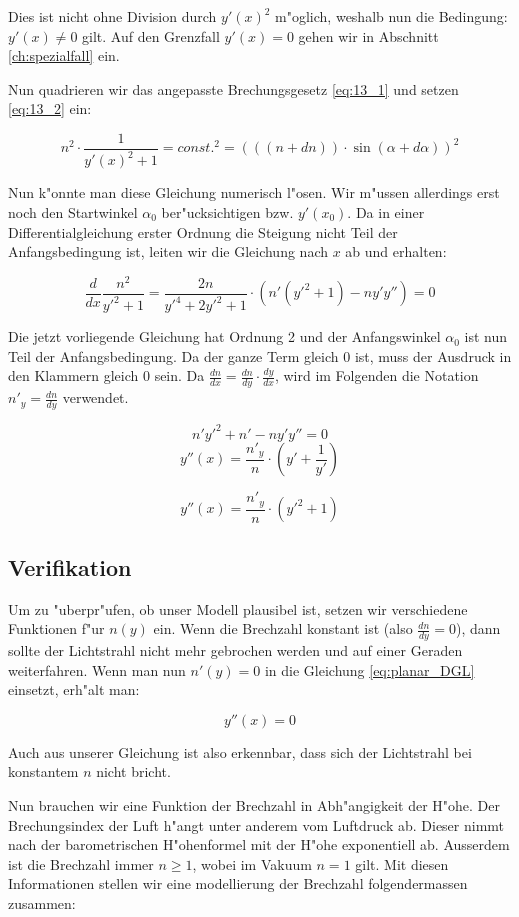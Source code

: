 \begin{refsection}
%
%
Dies ist nicht ohne Division durch $y'(x)^2$ m"oglich, weshalb nun die Bedingung: $y'(x) \neq 0$ gilt.
Auf den Grenzfall $y'(x) = 0$ gehen wir in Abschnitt \ref{ch:spezialfall} ein.

Nun quadrieren wir das angepasste Brechungsgesetz \ref{eq:13_1} und setzen \ref{eq:13_2} ein:

$$n^2 \cdot \frac{1}{y'(x)^2 + 1} = const.^2 = (((n + dn)) \cdot \sin(\alpha + d\alpha))^2$$

Nun k"onnte man diese Gleichung numerisch l"osen. 
Wir m"ussen allerdings erst noch den Startwinkel $\alpha_0$ ber"ucksichtigen bzw. $y'(x_0)$.
Da in einer Differentialgleichung erster Ordnung die Steigung nicht Teil der Anfangsbedingung ist, leiten wir die Gleichung nach $x$ ab und erhalten:

$$\frac{d}{dx} \frac{n^2}{y'^2 + 1}  = \frac{2n}{y'^4 + 2y'^2 + 1} \cdot \left( n'(y'^2 + 1) - n y' y'' \right) = 0$$

Die jetzt vorliegende Gleichung hat Ordnung 2 und der Anfangswinkel $\alpha_0$ ist nun Teil der Anfangsbedingung. 
Da der ganze Term gleich 0 ist, muss der Ausdruck in den Klammern gleich 0 sein.
Da $\frac{dn}{dx} = \frac{dn}{dy} \cdot \frac{dy}{dx}$, wird im Folgenden die Notation $n'_y = \frac{dn}{dy}$ verwendet.

$$n' y'^2 + n' - n y' y'' = 0$$
$$y''(x) = \frac{n'_y}{n} \cdot \left( y' + \frac{1}{y'} \right)$$

\begin{equation} \label{eq:planar_DGL}
y''(x) = \frac{n'_y}{n} \cdot \left( y'^2 + 1\right)
\end{equation}

\subsection{Verifikation}
Um zu "uberpr"ufen, ob unser Modell plausibel ist, setzen wir verschiedene Funktionen f"ur $n(y)$ ein. 
Wenn die Brechzahl konstant ist (also $\frac{dn}{dy} = 0$), dann sollte der Lichtstrahl nicht mehr gebrochen werden und auf einer Geraden weiterfahren. 
Wenn man nun $n'(y)=0$ in die Gleichung \ref{eq:planar_DGL} einsetzt, erh"alt man: 

$$y''(x) = 0$$

Auch aus unserer Gleichung ist also erkennbar, dass sich der Lichtstrahl bei konstantem $n$ nicht bricht.

Nun brauchen wir eine Funktion der Brechzahl in Abh"angigkeit der H"ohe. 
Der Brechungsindex der Luft h"angt unter anderem vom Luftdruck ab. 
Dieser nimmt nach der barometrischen H"ohenformel mit der H"ohe exponentiell ab.
Ausserdem ist die Brechzahl immer $n \geq 1$, wobei im Vakuum $n=1$ gilt. 
Mit diesen Informationen stellen wir eine modellierung der Brechzahl folgendermassen zusammen:


\end{refsection}
